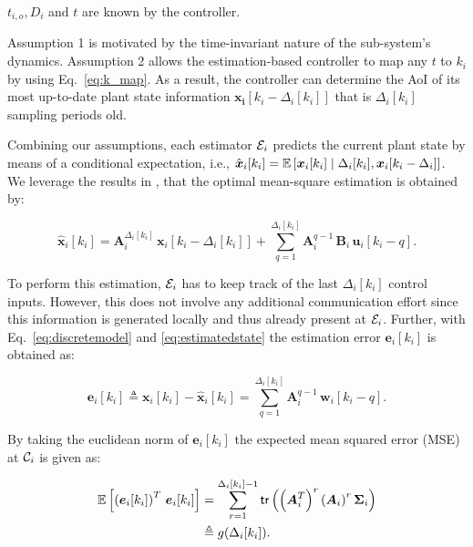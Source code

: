\begin{theorem}
  $t_{i,o}, D_i$ and $t$ are known by the controller. 
\end{theorem}

Assumption 1 is motivated by the time-invariant nature of the sub-system's
dynamics. Assumption 2 allows the estimation-based controller to map any $t$ to
$k_i$ by using Eq.~\eqref{eq:k_map}. As a result, the controller can determine
the AoI of its most up-to-date plant state information $\boldsymbol{x_i}[k_i -
\Delta_i[k_i]]$ that is $\Delta_i[k_i]$ sampling periods old.

Combining our assumptions, each estimator $\mathcal{E}_i$ predicts the current
plant state by means of a conditional expectation, i.e.,
$\hat{\boldsymbol{x}}_i[k_i] = \mathbb{E}\left[\boldsymbol{x}_i[k_i] \mid \Delta_i[k_i],
\boldsymbol{x}_i[k_i-\Delta_i] \right]$. We leverage the results in
\cite{ayan2019age}, that the optimal mean-square estimation is obtained by:

\begin{equation}
  \label{eq:estimatedstate}
    \boldsymbol{\hat{x}}_i[k_i] = \boldsymbol{A}_i^{\Delta_i[k_i]} \,  \boldsymbol{x}_i[k_i - \Delta_i[k_i]] + \sum_{q=1}^{\Delta_i[k_i]} \boldsymbol{A}_i^{q - 1} \, \boldsymbol{B}_i \, \boldsymbol{u}_i [k_i - q].
\end{equation}

To perform this estimation, $\mathcal{E}_i$ has to keep track of the last
$\Delta_i[k_i]$ control inputs. However, this does not involve any additional
communication effort since this information is generated locally and thus
already present at $\mathcal{E}_i$. Further, with Eq.~\eqref{eq:discretemodel} and
\eqref{eq:estimatedstate} the estimation error $\boldsymbol{e}_i[k_i]$ is
obtained as:

\begin{equation}
  \boldsymbol{e}_i[k_i] \triangleq \boldsymbol{x}_i[k_i] - \boldsymbol{\hat{x}}_i[k_i] = \sum_{q=1}^{\Delta_i[k_i]} \boldsymbol{A}_i^{q-1} \, \boldsymbol{w}_i[k_i - q].
\end{equation}

By taking the euclidean norm of $\boldsymbol{e}_i[k_i]$ the expected mean
squared error (MSE) at $\mathcal{C}_i$ is given as:

\begin{align}
  \label{eq:estimationerror}
  \mathbb{E} \left[ \left(\boldsymbol{e}_i[k_i]\right)^T \, \boldsymbol{e}_i[k_i]\right] & = \sum_{r=1}^{\Delta_i[k_i] - 1} \mathsf{tr} \left( \left(\boldsymbol{A}_i^T\right)^r  \left(\boldsymbol{A}_i \right)^r \boldsymbol{\Sigma}_i \right) \\ \nonumber
  & \triangleq g(\Delta_i[k_i]).
\end{align}

